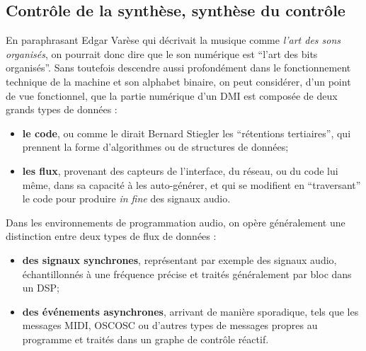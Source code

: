 \subsection{Contrôle de la synthèse, synthèse du contrôle}

\noindent En paraphrasant Edgar Varèse qui décrivait la musique comme \textit{l'art des sons organisés}, on pourrait donc dire que le son numérique est ``l'art des bits organisés''. Sans toutefois descendre aussi profondément dans le fonctionnement technique de la machine et son alphabet binaire, on peut considérer, d'un point de vue fonctionnel, que la partie numérique d'un \gls{DMI} est composée de deux grands types de données :
\vspace{-1em}
\begin{itemize}[noitemsep]
	\item \textbf{le code}, ou comme le dirait Bernard Stiegler les ``rétentions tertiaires'', qui prennent la forme d'algorithmes ou de structures de données;
	\item \textbf{les flux}, provenant des capteurs de l'interface, du réseau, ou du code lui même, dans sa capacité à les auto-générer, et qui se modifient en ``traversant'' le code pour produire \textit{in fine} des signaux audio.
\end{itemize}
\noindent Dans les environnements de programmation audio, on opère généralement une distinction entre deux types de flux de données : 
\vspace{-1em}
\begin{itemize}[noitemsep]
	\item \textbf{des signaux synchrones}, représentant par exemple des signaux audio, échantillonnés à une fréquence précise et traités généralement par bloc dans un \gls{DSP};
	\item \textbf{des événements asynchrones}, arrivant de manière sporadique, tels que les messages \gls{MIDI}, \gls{OSC}{OSC} ou d'autres types de messages propres au programme et traités dans un graphe de contrôle réactif.
\end{itemize}

